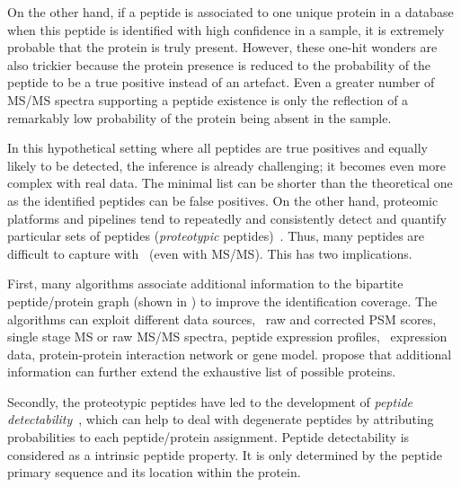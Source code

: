 On the other hand,
if a peptide is associated to one unique protein in a database
when this peptide is identified with high confidence in a sample,
it is extremely probable that the protein is truly present.
However, these one-hit wonders are also trickier because
the protein presence is reduced to
the probability of the peptide to be a true positive instead of an artefact.
Even a greater number of \gls{MS/MS} spectra supporting a peptide existence
is only the reflection of a remarkably low probability of the protein being absent
in the sample.

In this hypothetical setting
where all peptides are true positives and equally likely to be detected,
the inference is already challenging;
it becomes even more complex with real data.
The minimal list can be shorter than the theoretical one as
the identified peptides can be false positives.
On the other hand,
proteomic platforms and pipelines tend to
repeatedly and consistently detect and quantify particular sets of peptides
(\emph{proteotypic} peptides)~.
Thus, many peptides are difficult to capture with \ms\ (even with \gls{MS/MS}).
This has two implications.

First, many algorithms associate additional information
to the bipartite peptide/protein graph (shown in )
to improve the identification coverage.
The algorithms can exploit different data sources, \eg\ raw and corrected \gls{PSM} scores,
single stage \gls{MS} or raw \gls{MS/MS} spectra,
peptide expression profiles, \mRNA\ expression data,
protein-protein interaction network or gene model.
\citet{Huang2012-nr} propose that additional information can further
extend the exhaustive list of possible proteins.

Secondly, the proteotypic peptides have led to
the development of \emph{peptide detectability}~,
which can help to deal with degenerate peptides
by attributing probabilities to each peptide/protein assignment.
Peptide detectability is considered as a intrinsic peptide property.
It is only determined by the peptide primary sequence and
its location within the protein.

